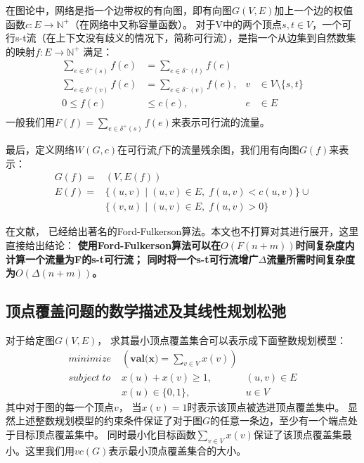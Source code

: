 在图论中，网络是指一个边带权的有向图，即有向图$G(V, E)$加上一个边的权值函数$c: E \rightarrow \mathbb{N}^+$（在网络中又称容量函数）。
对于V中的两个顶点$s, t \in V$，一个可行s-t流（在上下文没有歧义的情况下，简称可行流），是指一个从边集到自然数集的映射$f: E \rightarrow \mathbb{N}^+$ 满足：
\begin{equation} \label{EquationFlow} \begin{aligned}
  \sum_{e\in \delta^+(s)}{f(e)}&=\sum_{e\in \delta^-(t)}{f(e)}& \\
  \sum_{e\in \delta^+(v)}{f(e)}&=\sum_{e\in \delta^-(v)}{f(e)}, & v &\in V \setminus \{s, t\} \\
  0 \le f(e) &\le c(e), & e &\in E \\
\end{aligned} \end{equation}
一般我们用$F(f)=\sum_{e\in \delta^+(s)}{f(e)}$来表示可行流的流量。

最后，定义网络$W(G, c)$在可行流$f$下的流量残余图，我们用有向图$G(f)$来表示：
\begin{equation*} \begin{aligned}
  G(f) = &(V, E(f)) \\
  E(f) = &\{(u,v)\;|\;(u, v) \in E,\;f(u, v) < c(u, v)\} \cup \\
  &\{(v,u)\;|\;(u, v) \in E,\;f(u, v) > 0\}
\end{aligned} \end{equation*}

在文献\cite{ford1962flows}， 已经给出著名的Ford-Fulkerson算法。本文也不打算对其进行展开，这里直接给出结论：
\textbf{使用Ford-Fulkerson算法可以在$O(F(n + m))$时间复杂度内计算一个流量为F的s-t可行流；
同时将一个s-t可行流增广$\Delta$流量所需时间复杂度为$O(\Delta(n + m))$。}

\subsection{顶点覆盖问题的数学描述及其线性规划松弛}
对于给定图$G(V, E)$， 求其最小顶点覆盖集合可以表示成下面整数规划模型：
\begin{equation} \label{ModelVC} \begin{aligned}
  minimize\; & (\textbf{val(x)} = \sum_{v \in V}{x(v)}) &\\
  subject\; to\; & x(u) + x(v) \ge 1, &(u, v) \in E \\
   & x(u) \in \{0, 1\}, & u \in V
\end{aligned} \end{equation}
其中对于图的每一个顶点$v$， 当$x(v) = 1$时表示该顶点被选进顶点覆盖集中。
显然上述整数规划模型的约束条件保证了对于图$G$的任意一条边，至少有一个端点处于目标顶点覆盖集中。
同时最小化目标函数$\sum_{v \in V}{x(v)}$保证了该顶点覆盖集最小。这里我们用$vc(G)$表示最小顶点覆盖集合的大小。

